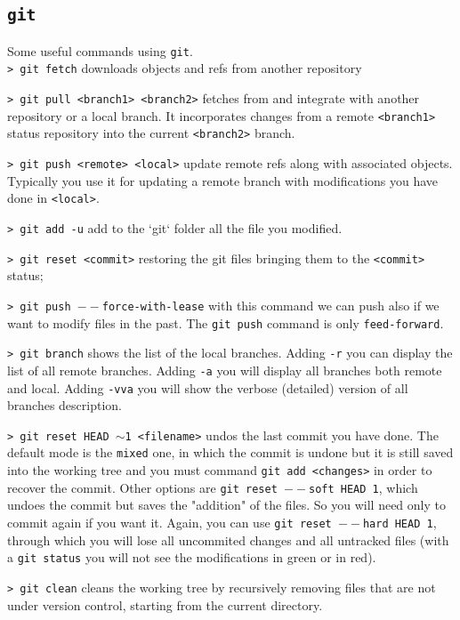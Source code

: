 \documentclass[11pt]{article}
\newcommand{\cmd}[1]{\colorbox{light-gray}{\textcolor{gio}{\texttt{#1}}}}
\begin{document}
\begin{multicols}{2}
\section{\texttt{git}}

Some useful commands using \texttt{git}. \\

\cmd{> git fetch} downloads objects and refs from another repository

\cmd{> git pull <branch1> <branch2>} fetches from and integrate with another 
repository or a local branch. It incorporates changes from a remote \texttt{<branch1>} 
status repository into the current \texttt{<branch2>} branch.

\cmd{> git push <remote> <local>} update remote refs along with associated objects. 
Typically you use it for updating a remote branch with modifications you have done 
in \texttt{<local>}.

\cmd{> git add -u} add to the `git` folder all the file you modified.

\cmd{> git reset <commit>} restoring the git files bringing them to the 
\texttt{<commit>} status;

\cmd{> git push $--$force-with-lease} with this command we can push also if we 
want to modify files in the past. The \texttt{git push} command is only \texttt{feed-forward}.

\cmd{> git branch} shows the list of the local branches. Adding \texttt{-r} you 
can display the list of all remote branches. Adding \texttt{-a} you will display 
all branches both remote and local. Adding \cmd{-vva} you will show the verbose 
(detailed) version of all branches description.  

\cmd{> git reset HEAD $\sim$1 <filename>} undos the last commit you have done. 
The default mode is the \texttt{mixed} one, in which the commit is undone but it 
is still saved into the working tree and you must command \texttt{git add <changes>} 
in order to recover the commit. Other options are \texttt{git reset $--$soft HEAD~1}, 
which undoes the commit but saves the "addition" of the files. So you will need 
only to commit again if you want it. Again, you can use \texttt{git reset $--$hard HEAD~1}, 
through which you will lose all uncommited changes and all untracked files 
(with a \texttt{git status} you will not see the modifications in green or in red).

\cmd{> git clean} cleans the working tree by recursively removing files that are 
not under version control, starting from the current directory.


\end{multicols}
\end{document}
